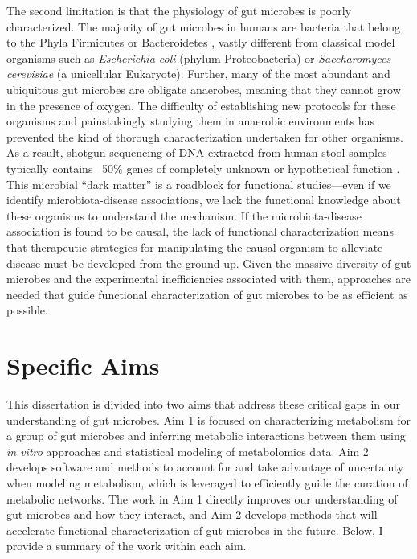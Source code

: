 \documentclass[11pt,twocolumn,notitlepage,openany,twoside]{book}
\begin{document}
\begin{refsection}
The second limitation is that the physiology of gut microbes is poorly characterized. The majority of gut microbes in humans are bacteria that belong to the Phyla Firmicutes or Bacteroidetes \cite{Turnbaugh2007-cd}, vastly different from classical model organisms such as \textit{Escherichia coli} (phylum Proteobacteria) or \textit{Saccharomyces cerevisiae} (a unicellular Eukaryote). Further, many of the most abundant and ubiquitous gut microbes are obligate anaerobes, meaning that they cannot grow in the presence of oxygen. The difficulty of establishing new protocols for these organisms and painstakingly studying them in anaerobic environments has prevented the kind of thorough characterization undertaken for other organisms. As a result, shotgun sequencing of DNA extracted from human stool samples typically contains ~50\% genes of completely unknown or hypothetical function \cite{Joice2014-tp}. This microbial “dark matter” is a roadblock for functional studies---even if we identify microbiota-disease associations, we lack the functional knowledge about these organisms to understand the mechanism. If the microbiota-disease association is found to be causal, the lack of functional characterization means that therapeutic strategies for manipulating the causal organism to alleviate disease must be developed from the ground up. Given the massive diversity of gut microbes and the experimental inefficiencies associated with them, approaches are needed that guide functional characterization of gut microbes to be as efficient as possible.

\section{Specific Aims}

This dissertation is divided into two aims that address these critical gaps in our understanding of gut microbes. Aim 1 is focused on characterizing metabolism for a group of gut microbes and inferring metabolic interactions between them using \textit{in vitro} approaches and statistical modeling of metabolomics data. Aim 2 develops software and methods to account for and take advantage of uncertainty when modeling metabolism, which is leveraged to efficiently guide the curation of metabolic networks. The work in Aim 1 directly improves our understanding of gut microbes and how they interact, and Aim 2 develops methods that will accelerate functional characterization of gut microbes in the future. Below, I provide a summary of the work within each aim.
\\[12pt]



\end{refsection}
\end{document}
